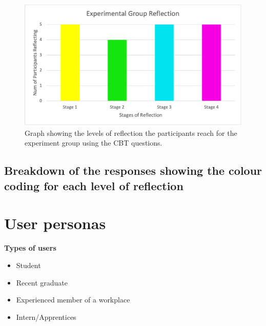 \documentclass{l4proj}
\begin{document}
\begin{appendices}
\begin{figure}[H]
    \begin{centering}
    \includegraphics[scale=0.5]{images/ABExperimentGraph.png}
    \caption{Graph showing the levels of reflection the participants reach for the experiment group using the CBT questions.}
    \label{fig: Appen-ExperimentGraph}
    \end{centering}
\end{figure}

\subsection{Breakdown of the responses showing the colour coding for each level of reflection} \label{Appendix-AB-responses}





%
\section{User personas} \label{Appendix-userPersonas}

\textbf{Types of users}
\begin{itemize}
    \item Student
    \item Recent graduate
    \item Experienced member of a workplace
    \item Intern/Apprentices
\end{itemize}


\end{appendices}
\end{document}
